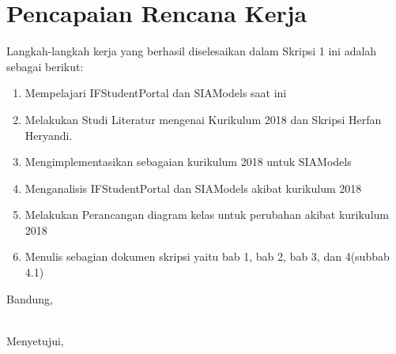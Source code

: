 \documentclass[a4paper,twoside]{article}
\begin{document}
\section{Pencapaian Rencana Kerja}
Langkah-langkah kerja yang berhasil diselesaikan dalam Skripsi 1 ini adalah sebagai berikut:
\begin{enumerate}
\item Mempelajari IFStudentPortal dan SIAModels saat ini
\item Melakukan Studi Literatur mengenai Kurikulum 2018 dan Skripsi Herfan Heryandi.
\item Mengimplementasikan sebagaian kurikulum 2018 untuk SIAModels
\item Menganalisis IFStudentPortal dan SIAModels akibat kurikulum 2018
\item Melakukan Perancangan diagram kelas untuk perubahan akibat kurikulum 2018
\item Menulis sebagian dokumen skripsi yaitu bab 1, bab 2, bab 3, dan 4(subbab 4.1)
\end{enumerate}

\vspace{1cm}
\centering Bandung, \tanggal\\
\vspace{2cm} \nama \\ 
\vspace{1cm}

Menyetujui, \\
\end{document}
